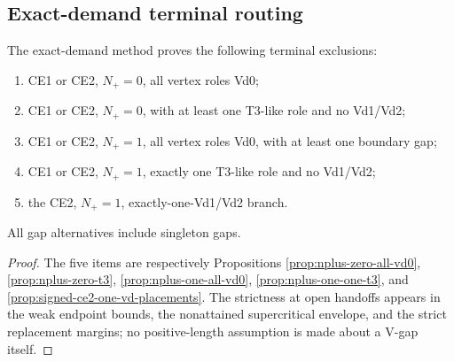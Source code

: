 \subsection{Exact-demand terminal routing}

\begin{proposition}
\label{prop:demand-branches}
The exact-demand method proves the following terminal exclusions:
\begin{enumerate}
\item CE1 or CE2, $N_+=0$, all vertex roles Vd0;
\item CE1 or CE2, $N_+=0$, with at least one T3-like role and no Vd1/Vd2;
\item CE1 or CE2, $N_+=1$, all vertex roles Vd0, with at least one boundary
gap;
\item CE1 or CE2, $N_+=1$, exactly one T3-like role and no Vd1/Vd2;
\item the CE2, $N_+=1$, exactly-one-Vd1/Vd2 branch.
\end{enumerate}
All gap alternatives include singleton gaps.
\end{proposition}

\begin{proof}
The five items are respectively Propositions
\ref{prop:nplus-zero-all-vd0}, \ref{prop:nplus-zero-t3},
\ref{prop:nplus-one-all-vd0}, \ref{prop:nplus-one-one-t3}, and
\ref{prop:signed-ce2-one-vd-placements}.  The strictness at open handoffs appears in
the weak endpoint bounds, the nonattained supercritical envelope, and the
strict replacement margins; no positive-length assumption is made about a
V-gap itself.
\end{proof}
